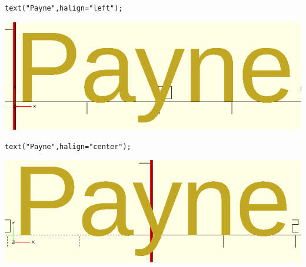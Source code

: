\begin{center}
\begin{minipage}[]{.65\textwidth}%
 \begin{lstlisting}[numbers=none]
text("Payne",halign="left");
\end{lstlisting}%
\end{minipage}\hfill
\begin{minipage}[]{.35\textwidth}%
  \centering
  \includegraphics[width=.7\textwidth]{imagenes/payne-left}
\end{minipage}
\end{center}

\begin{center}
\begin{minipage}[]{.65\textwidth}%
 \begin{lstlisting}[numbers=none]
text("Payne",halign="center");
\end{lstlisting}%
\end{minipage}\hfill
\begin{minipage}[]{.35\textwidth}%
  \centering
  \includegraphics[width=.7\textwidth]{imagenes/payne-center-h}
\end{minipage}
\end{center}

